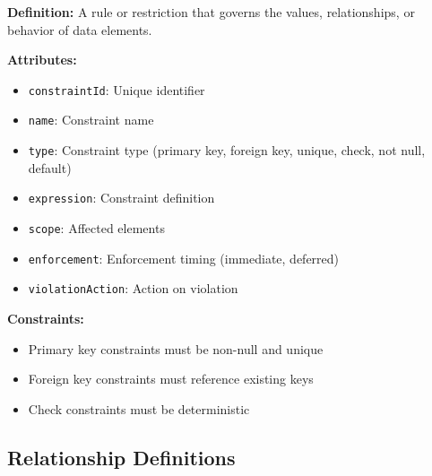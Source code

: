 \documentclass[11pt,letterpaper]{article}
\begin{document}
\begin{definitionbox}
\textbf{Definition:} A rule or restriction that governs the values, relationships, or behavior of data elements.

\textbf{Attributes:}
\begin{itemize}[nosep]
    \item \texttt{constraintId}: Unique identifier
    \item \texttt{name}: Constraint name
    \item \texttt{type}: Constraint type (primary key, foreign key, unique, check, not null, default)
    \item \texttt{expression}: Constraint definition
    \item \texttt{scope}: Affected elements
    \item \texttt{enforcement}: Enforcement timing (immediate, deferred)
    \item \texttt{violationAction}: Action on violation
\end{itemize}

\textbf{Constraints:}
\begin{itemize}[nosep]
    \item Primary key constraints must be non-null and unique
    \item Foreign key constraints must reference existing keys
    \item Check constraints must be deterministic
\end{itemize}
\end{definitionbox}

\subsection{Relationship Definitions}
\end{document}
